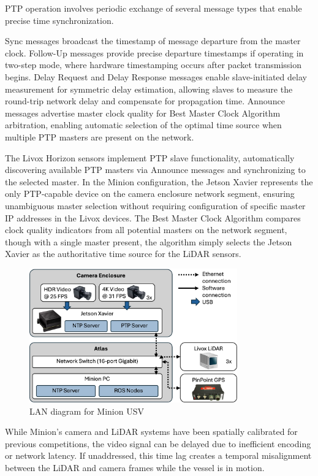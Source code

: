 \documentclass{erauthesis}
\begin{document}
PTP operation involves periodic exchange of several message types that enable precise time synchronization.

Sync messages broadcast the timestamp of message departure from the master clock.
Follow-Up messages provide precise departure timestamps if operating in two-step mode, where hardware timestamping occurs after packet transmission begins.
Delay Request and Delay Response messages enable slave-initiated delay measurement for symmetric delay estimation, allowing slaves to measure the round-trip network delay and compensate for propagation time.
Announce messages advertise master clock quality for Best Master Clock Algorithm arbitration, enabling automatic selection of the optimal time source when multiple PTP masters are present on the network.

The Livox Horizon sensors implement PTP slave functionality, automatically discovering available PTP masters via Announce messages and synchronizing to the selected master.
In the Minion configuration, the Jetson Xavier represents the only PTP-capable device on the camera enclosure network segment, ensuring unambiguous master selection without requiring configuration of specific master IP addresses in the Livox devices.
The Best Master Clock Algorithm compares clock quality indicators from all potential masters on the network segment, though with a single master present, the algorithm simply selects the Jetson Xavier as the authoritative time source for the LiDAR sensors.

\begin{figure}[htbp]
\centering
\includegraphics[width=0.8\textwidth]{Images/network_diagram2.png}
\caption{LAN diagram for Minion USV}
\label{fig:network_sync}
\end{figure}

While Minion's camera and LiDAR systems have been spatially calibrated for previous competitions, the video signal can be delayed due to inefficient encoding or network latency. 
If unaddressed, this time lag creates a temporal misalignment between the LiDAR and camera frames while the vessel is in motion.
\end{document}
